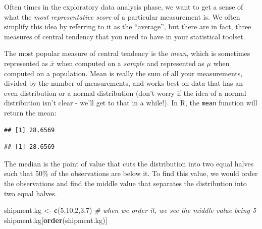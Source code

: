 \documentclass[]{article}
\newenvironment{Shaded}{\begin{snugshade}}{\end{snugshade}}
\newcommand{\CommentTok}[1]{\textcolor[rgb]{0.56,0.35,0.01}{\textit{#1}}}
\newcommand{\DecValTok}[1]{\textcolor[rgb]{0.00,0.00,0.81}{#1}}
\newcommand{\KeywordTok}[1]{\textcolor[rgb]{0.13,0.29,0.53}{\textbf{#1}}}
\newcommand{\NormalTok}[1]{#1}
\newcommand{\OperatorTok}[1]{\textcolor[rgb]{0.81,0.36,0.00}{\textbf{#1}}}
\newcommand{\StringTok}[1]{\textcolor[rgb]{0.31,0.60,0.02}{#1}}
\begin{document}
Often times in the exploratory data analysis phase, we want to get a
sense of what the \emph{most representative score} of a particular
measurement is. We often simplify this idea by referring to it as the
``average'', but there are in fact, three measures of central tendency
that you need to have in your statistical toolset.

The most popular measure of central tendency is the \emph{mean}, which
is sometimes represented as \(\bar{x}\) when computed on a \emph{sample}
and represented as \(\mu\) when computed on a population. Mean is really
the sum of all your measurements, divided by the number of measurements,
and works best on data that has an even distribution or a normal
distribution (don't worry if the idea of a normal distribution isn't
clear - we'll get to that in a while!). In R, the \texttt{mean} function
will return the mean:

\begin{Shaded}
\end{Shaded}

\begin{verbatim}
## [1] 28.6569
\end{verbatim}

\begin{Shaded}
\end{Shaded}

\begin{verbatim}
## [1] 28.6569
\end{verbatim}

The median is the point of value that cuts the distribution into two
equal halves such that 50\% of the observations are below it. To find
this value, we would order the observations and find the middle value
that separates the distribution into two equal halves.

\begin{Shaded}
\begin{Highlighting}[]
\NormalTok{shipment.kg <-}\StringTok{ }\KeywordTok{c}\NormalTok{(}\DecValTok{5}\NormalTok{,}\DecValTok{10}\NormalTok{,}\DecValTok{2}\NormalTok{,}\DecValTok{3}\NormalTok{,}\DecValTok{7}\NormalTok{)}
\CommentTok{# when we order it, we see the middle value being 5}
\NormalTok{shipment.kg[}\KeywordTok{order}\NormalTok{(shipment.kg)]}
\end{Highlighting}
\end{Shaded}
\end{document}
